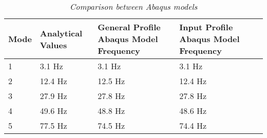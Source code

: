 \begin{table}[H]
\begin{center}
    \begin{tabular}{|l| p{3.5cm}| p{3cm}| p{3cm}| p{3cm}|}
    \hline
    \textbf{Mode} & \textbf{Analytical Values} & \textbf{General Profile Abaqus Model Frequency}& \textbf{Input Profile Abaqus Model Frequency} \\\hline
    1    & 3.1 Hz            & 3.1 Hz                             & 3.1 Hz     \\\hline
    2    & 12.4 Hz           & 12.5 Hz                            & 12.4 Hz     \\\hline
    3    & 27.9 Hz           & 27.8 Hz                            & 27.8 Hz     \\\hline
    4    & 49.6 Hz           & 48.8 Hz                            & 48.6 Hz      \\\hline
    5    & 77.5 Hz           & 74.5 Hz                            & 74.4 Hz    \\\hline
    \end{tabular}
    \caption{\textit{Comparison between Abaqus models}}
    \label{tab:FEM_Abaqus_Comp}
\end{center}
\end{table}

